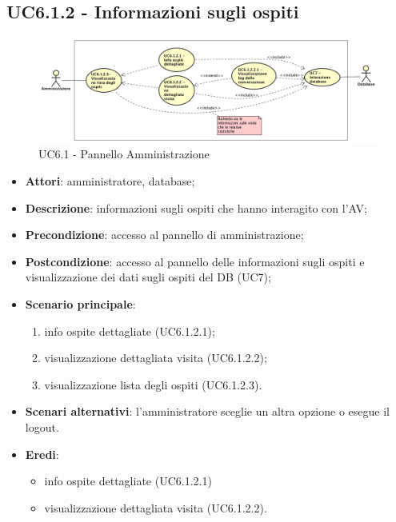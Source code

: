 \documentclass[../AnalisiDeiRequisiti.tex]{subfiles}
\begin{document}
\subsection{UC6.1.2 - Informazioni sugli ospiti}
\begin{figure}[!h]
	\centering
	\includegraphics[width=\textwidth]{UseCases/UC6-Amministrazione/Immagini/UCInformazioniSugliOspiti.png}
	\caption{UC6.1 - Pannello Amministrazione}
\end{figure}	
\label{sssec:UC6.1.2} 
\begin{itemize} 
\item \textbf{Attori}: amministratore, database;
\item \textbf{Descrizione}: informazioni sugli ospiti che hanno interagito con l'AV;
\item \textbf{Precondizione}: accesso al pannello di amministrazione;
\item \textbf{Postcondizione}: accesso al pannello delle informazioni sugli ospiti e visualizzazione dei dati sugli ospiti del DB (UC7);
\item \textbf{Scenario principale}: \begin{enumerate}\item info ospite dettagliate (UC6.1.2.1);\item visualizzazione dettagliata visita (UC6.1.2.2);\item visualizzazione lista degli ospiti (UC6.1.2.3). 
 \end{enumerate}
\item \textbf{Scenari alternativi}: l'amministratore sceglie un altra opzione o esegue il logout.
\item \textbf{Eredi}:\begin{itemize}\item info ospite dettagliate (UC6.1.2.1)\item visualizzazione dettagliata visita (UC6.1.2.2). 
\end{itemize}\end{itemize} 
\end{document}
